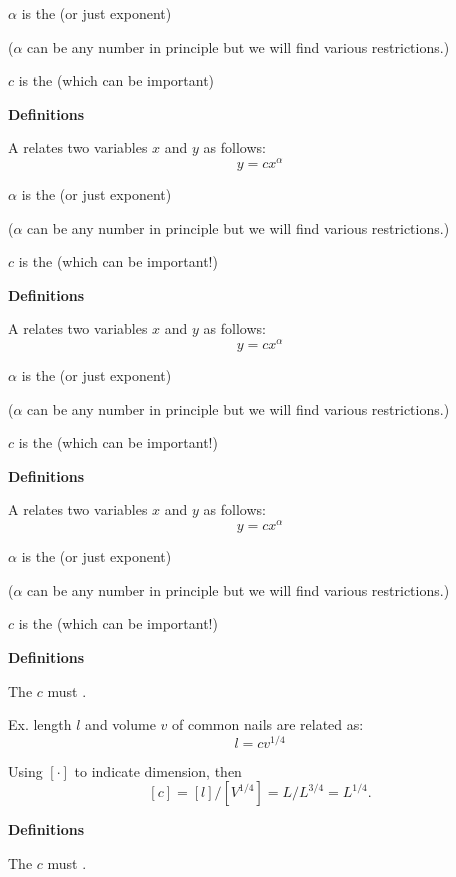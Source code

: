 $\alpha$ is the  (or just exponent)

($\alpha$ can be any number in principle but we will
find various restrictions.)

$c$ is the  (which can be important)


  \textbf{Definitions}

A  relates two
variables $x$ and $y$ as follows:
{\Large
$$ y = c x^\alpha $$
}

$\alpha$ is the  (or just exponent)

\inv 

($\alpha$ can be any number in principle but we will
find various restrictions.)

$c$ is the  (which can be important!)


  \textbf{Definitions}

A  relates two
variables $x$ and $y$ as follows:
{\Large
$$ y = c x^\alpha $$
}

$\alpha$ is the  (or just exponent)

($\alpha$ can be any number in principle but we will
find various restrictions.)

\inv

$c$ is the  (which can be important!)


  \textbf{Definitions}

A  relates two
variables $x$ and $y$ as follows:
{\Large
$$ y = c x^\alpha $$
}

$\alpha$ is the  (or just exponent)

($\alpha$ can be any number in principle but we will
find various restrictions.)

$c$ is the  (which can be important!)


  \textbf{Definitions}

The  $c$ must .

\inv

Ex. length $l$ and volume $v$ of common nails
are related as:\
$$l = c v^{1/4}$$

Using $[ \cdot ]$ to indicate dimension, then 
$$[c] = [l]/[V^{1/4}] = L/L^{3/4} = L^{1/4}.$$


  \textbf{Definitions}

The  $c$ must .

